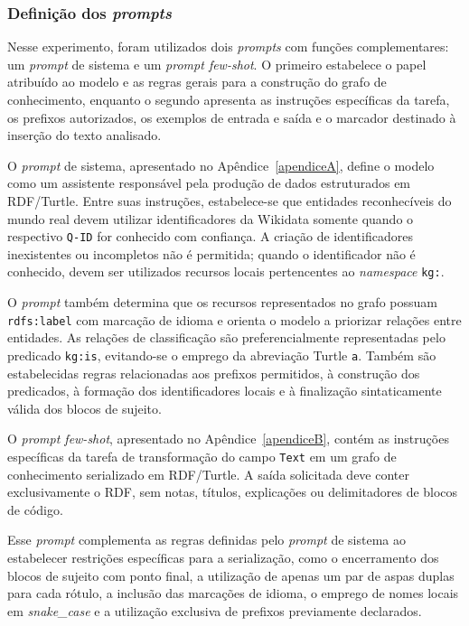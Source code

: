 \subsubsection{Definição dos \textit{prompts}}

Nesse experimento, foram utilizados dois \textit{prompts} com funções complementares: um \textit{prompt} de sistema e um \textit{prompt few-shot}. O primeiro estabelece o papel atribuído ao modelo e as regras gerais para a construção do grafo de conhecimento, enquanto o segundo apresenta as instruções específicas da tarefa, os prefixos autorizados, os exemplos de entrada e saída e o marcador destinado à inserção do texto analisado.

O \textit{prompt} de sistema, apresentado no Apêndice~\ref{apendiceA}, define o modelo como um assistente responsável pela produção de dados estruturados em RDF/Turtle. Entre suas instruções, estabelece-se que entidades reconhecíveis do mundo real devem utilizar identificadores da Wikidata somente quando o respectivo \texttt{Q-ID} for conhecido com confiança. A criação de identificadores inexistentes ou incompletos não é permitida; quando o identificador não é conhecido, devem ser utilizados recursos locais pertencentes ao \textit{namespace} \texttt{kg:}.

O \textit{prompt} também determina que os recursos representados no grafo possuam \texttt{rdfs:label} com marcação de idioma e orienta o modelo a priorizar relações entre entidades. As relações de classificação são preferencialmente representadas pelo predicado \texttt{kg:is}, evitando-se o emprego da abreviação Turtle \texttt{a}. Também são estabelecidas regras relacionadas aos prefixos permitidos, à construção dos predicados, à formação dos identificadores locais e à finalização sintaticamente válida dos blocos de sujeito.

O \textit{prompt few-shot}, apresentado no Apêndice~\ref{apendiceB}, contém as instruções específicas da tarefa de transformação do campo \texttt{Text} em um grafo de conhecimento serializado em RDF/Turtle. A saída solicitada deve conter exclusivamente o RDF, sem notas, títulos, explicações ou delimitadores de blocos de código.

Esse \textit{prompt} complementa as regras definidas pelo \textit{prompt} de sistema ao estabelecer restrições específicas para a serialização, como o encerramento dos blocos de sujeito com ponto final, a utilização de apenas um par de aspas duplas para cada rótulo, a inclusão das marcações de idioma, o emprego de nomes locais em \textit{snake\_case} e a utilização exclusiva de prefixos previamente declarados.

